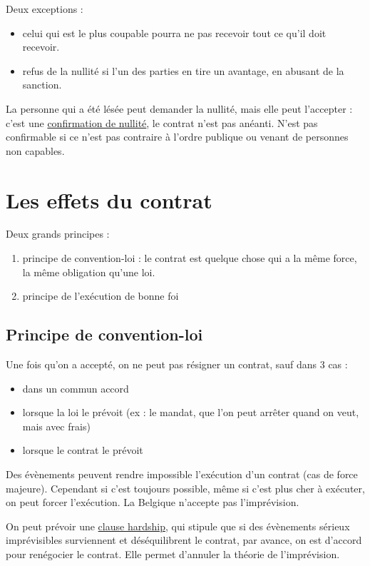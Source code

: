 		Deux exceptions : 
		
		\begin{itemize}
			\item celui qui est le plus coupable pourra ne pas recevoir tout ce qu'il doit recevoir.
			\item refus de la nullité si l'un des parties en tire un avantage, en abusant de la sanction.
		\end{itemize}
		
		La personne qui a été lésée peut demander la nullité, mais elle peut l'accepter : c'est une \underline{confirmation de nullité}, le contrat n'est pas anéanti. N'est pas confirmable si ce n'est pas contraire à l'ordre publique ou venant de personnes non capables.
		
	\section{Les effets du contrat}
	
	Deux grands principes :
	
	\begin{enumerate}
		\item principe de convention-loi : le contrat est quelque chose qui a la même force, la même obligation qu'une loi.
		\item principe de l'exécution de bonne foi
	\end{enumerate}
	
		\subsection{Principe de convention-loi}
		Une fois qu'on a accepté, on ne peut pas résigner un contrat, sauf dans 3 cas :
	
		\begin{itemize}
			\item dans un commun accord
			\item lorsque la loi le prévoit (ex : le mandat, que l'on peut arrêter quand on veut, mais avec frais) 
			\item lorsque le contrat le prévoit
		\end{itemize}
		
		Des évènements peuvent rendre impossible l'exécution d'un contrat (cas de force majeure). Cependant si c'est toujours possible, même si c'est plus cher à exécuter, on peut forcer l'exécution. La Belgique n'accepte pas l'imprévision. 
		
		On peut prévoir une \underline{clause hardship}, qui stipule que si des évènements sérieux imprévisibles surviennent et déséquilibrent le contrat, par avance, on est d'accord pour renégocier le contrat. Elle permet d'annuler la théorie de l'imprévision.
	
